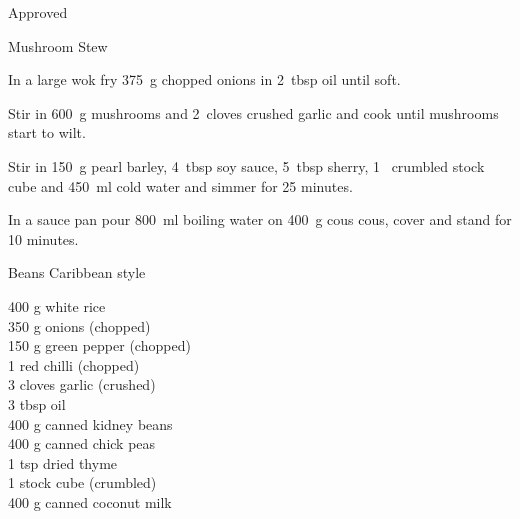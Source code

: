 \begin{menu}{Approved}
\begin{recipe}{2}{Mushroom Stew}
\begin{ingredients}
		\end{ingredients}
	
	
    \begin{instructions}
    \item 
        In a large wok fry
        375~g chopped onions
        in
        2~tbsp  oil
        until soft.
      \item 
        Stir in
        600~g  mushrooms
        and
        2~cloves crushed garlic
        and cook until mushrooms start to wilt.
      \item 
        Stir in
        150~g  pearl barley,
        4~tbsp  soy sauce,
        5~tbsp  sherry,
        1~ crumbled stock cube
        and
        450~ml  cold water
        and simmer for 25 minutes.
      \item 
      In a
      sauce pan pour 800~ml  boiling water
      on 400~g  cous cous, cover and
      stand for 10 minutes.
    
    \end{instructions}
    \end{recipe}%
  
    \begin{recipe}{2}{Beans Caribbean style}%
    
		\begin{ingredients}
		400 g white rice  \\
	350 g onions (chopped) \\
	150 g green pepper (chopped) \\
	1  red chilli (chopped) \\
	3 cloves garlic (crushed) \\
	3 tbsp oil  \\
	400 g canned kidney beans  \\
	400 g canned chick peas  \\
	1 tsp dried thyme  \\
	1  stock cube (crumbled) \\
	400 g canned coconut milk  \\
	
		\end{ingredients}
	
	

\end{recipe}
\end{menu}
